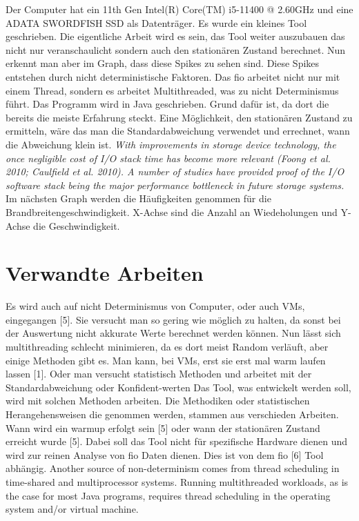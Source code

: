 \documentclass{article}
\begin{document}
Der Computer hat ein 11th Gen Intel(R) Core(TM) i5-11400 @ 2.60GHz und eine ADATA SWORDFISH SSD als Datenträger.
Es wurde ein kleines Tool geschrieben. Die eigentliche Arbeit wird es sein, das Tool weiter auszubauen das nicht nur veranschaulicht
sondern auch den stationären Zustand berechnet.
Nun erkennt man aber im Graph, dass diese Spikes zu sehen sind. Diese Spikes entstehen durch nicht deterministische Faktoren.
Das fio arbeitet nicht nur mit einem Thread, sondern es arbeitet Multithreaded, was zu nicht Determinismus führt. 
Das Programm wird in Java geschrieben. Grund dafür ist, da dort die bereits die meiste Erfahrung steckt.
Eine Möglichkeit, den stationären Zustand zu ermitteln, wäre das man die Standardabweichung verwendet und errechnet, wann die Abweichung klein ist.
\textit{With improvements in storage device technology, the once negligible cost of I/O stack time has become more relevant (Foong et al. 2010; Caulfield et al. 2010). A number
of studies have provided proof of the I/O software stack being the major performance bottleneck in future storage systems.}
Im nächsten Graph werden die Häufigkeiten genommen für die Brandbreitengeschwindigkeit. X-Achse sind die Anzahl an Wiedeholungen und Y-Achse die Geschwindigkeit.
\section{Verwandte Arbeiten}
Es wird auch auf nicht Determinismus von Computer, oder auch VMs, eingegangen [5]. Sie versucht man so gering wie möglich zu halten, da sonst bei der Auswertung nicht akkurate Werte
berechnet werden können. Nun lässt sich multithreading schlecht minimieren, da es dort meist Random verläuft, aber einige Methoden gibt es. Man kann, bei VMs,
erst sie erst mal warm laufen  lassen [1]. Oder man versucht statistisch Methoden und arbeitet mit der Standardabweichung oder Konfident-werten
Das Tool, was entwickelt werden soll, wird mit solchen Methoden arbeiten. Die Methodiken oder statistischen Herangehensweisen die genommen werden,
stammen aus verschieden Arbeiten. Wann wird ein warmup erfolgt sein [5]
oder wann der stationären Zustand erreicht wurde [5]. Dabei soll das Tool nicht für spezifische Hardware dienen und wird zur reinen Analyse von fio Daten dienen. 
Dies ist von dem fio [6] Tool abhängig.
Another source of non-determinism comes from thread scheduling in time-shared and multiprocessor systems. Running multithreaded
workloads, as is the case for most Java programs, requires thread scheduling in the operating system and/or virtual machine.  
\newpage
\end{document}
